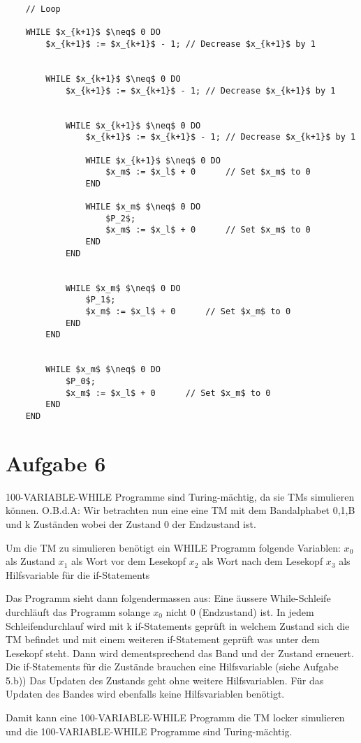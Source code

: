 \documentclass[a4paper,11pt]{scrartcl}
\begin{document}
\begin{enumerate}[label=\alph*)]
\begin{lstlisting}
	// Loop	
	
	WHILE $x_{k+1}$ $\neq$ 0 DO
		$x_{k+1}$ := $x_{k+1}$ - 1;	// Decrease $x_{k+1}$ by 1
		
		
		WHILE $x_{k+1}$ $\neq$ 0 DO
			$x_{k+1}$ := $x_{k+1}$ - 1;	// Decrease $x_{k+1}$ by 1
		
		
			WHILE $x_{k+1}$ $\neq$ 0 DO
				$x_{k+1}$ := $x_{k+1}$ - 1;	// Decrease $x_{k+1}$ by 1
				
				WHILE $x_{k+1}$ $\neq$ 0 DO
					$x_m$ := $x_l$ + 0		// Set $x_m$ to 0
				END
		
				WHILE $x_m$ $\neq$ 0 DO
					$P_2$;
					$x_m$ := $x_l$ + 0		// Set $x_m$ to 0
				END
			END
		
		
			WHILE $x_m$ $\neq$ 0 DO
				$P_1$;
				$x_m$ := $x_l$ + 0		// Set $x_m$ to 0
			END
		END
		
		
		WHILE $x_m$ $\neq$ 0 DO
			$P_0$;
			$x_m$ := $x_l$ + 0		// Set $x_m$ to 0
		END
	END
	\end{lstlisting}
	\end{enumerate}
	
	
	\newpage
	\section*{Aufgabe 6}
	100-VARIABLE-WHILE Programme sind Turing-mächtig, da sie TMs simulieren können.
	O.B.d.A: Wir betrachten nun eine eine TM mit dem Bandalphabet {0,1,B} und k Zuständen wobei der Zustand 0 der Endzustand ist.

	Um die TM zu simulieren benötigt ein WHILE Programm folgende Variablen:
	$x_0$ als Zustand
	$x_1$ als Wort vor dem Lesekopf
	$x_2$ als Wort nach dem Lesekopf
	$x_3$ als Hilfsvariable für die if-Statements

	Das Programm sieht dann folgendermassen aus:
	Eine äussere While-Schleife durchläuft das Programm solange $x_0$ nicht 0 (Endzustand) ist.
	In jedem Schleifendurchlauf wird mit k if-Statements geprüft in welchem Zustand sich die TM befindet und mit einem weiteren if-Statement geprüft was unter dem Lesekopf steht.
	Dann wird dementsprechend das Band und der Zustand erneuert.
	Die if-Statements für die Zustände brauchen eine Hilfsvariable (siehe Aufgabe 5.b))
	Das Updaten des Zustands geht ohne weitere Hilfsvariablen.
	Für das Updaten des Bandes wird ebenfalls keine Hilfsvariablen benötigt.

	Damit kann eine 100-VARIABLE-WHILE Programm die TM locker simulieren und die 100-VARIABLE-WHILE Programme sind Turing-mächtig.
\end{document}

